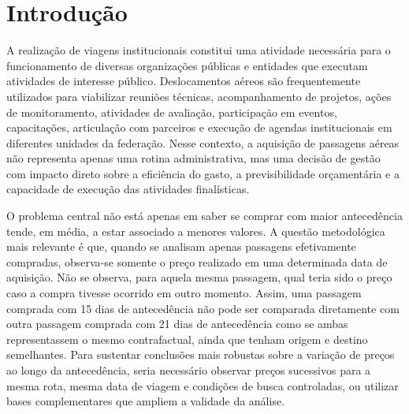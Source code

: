 \section{Introdução}

A realização de viagens institucionais constitui uma atividade necessária para o funcionamento de diversas organizações públicas e entidades que executam atividades de interesse público. Deslocamentos aéreos são frequentemente utilizados para viabilizar reuniões técnicas, acompanhamento de projetos, ações de monitoramento, atividades de avaliação, participação em eventos, capacitações, articulação com parceiros e execução de agendas institucionais em diferentes unidades da federação. Nesse contexto, a aquisição de passagens aéreas não representa apenas uma rotina administrativa, mas uma decisão de gestão com impacto direto sobre a eficiência do gasto, a previsibilidade orçamentária e a capacidade de execução das atividades finalísticas.

O problema central não está apenas em saber se comprar com maior antecedência tende, em média, a estar associado a menores valores. A questão metodológica mais relevante é que, quando se analisam apenas passagens efetivamente compradas, observa-se somente o preço realizado em uma determinada data de aquisição. Não se observa, para aquela mesma passagem, qual teria sido o preço caso a compra tivesse ocorrido em outro momento. Assim, uma passagem comprada com 15 dias de antecedência não pode ser comparada diretamente com outra passagem comprada com 21 dias de antecedência como se ambas representassem o mesmo contrafactual, ainda que tenham origem e destino semelhantes. Para sustentar conclusões mais robustas sobre a variação de preços ao longo da antecedência, seria necessário observar preços sucessivos para a mesma rota, mesma data de viagem e condições de busca controladas, ou utilizar bases complementares que ampliem a validade da análise.
